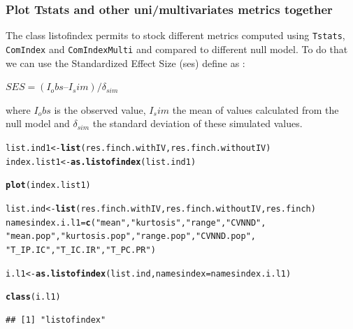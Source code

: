 \documentclass[12pt]{article}\usepackage[]{graphicx}\usepackage[]{color}
\makeatletter
\newcommand{\hlstr}[1]{\textcolor[rgb]{0.192,0.494,0.8}{#1}}%
\newcommand{\hlstd}[1]{\textcolor[rgb]{0.345,0.345,0.345}{#1}}%
\newcommand{\hlkwb}[1]{\textcolor[rgb]{0.69,0.353,0.396}{#1}}%
\newcommand{\hlkwc}[1]{\textcolor[rgb]{0.333,0.667,0.333}{#1}}%
\newcommand{\hlkwd}[1]{\textcolor[rgb]{0.737,0.353,0.396}{\textbf{#1}}}%
\newenvironment{kframe}{%
 \def\at@end@of@kframe{}%
 \ifinner\ifhmode%
  \def\at@end@of@kframe{\end{minipage}}%
  \begin{minipage}{\columnwidth}%
 \fi\fi%
 \def\FrameCommand##1{\hskip\@totalleftmargin \hskip-\fboxsep
 \colorbox{shadecolor}{##1}\hskip-\fboxsep
     \hskip-\linewidth \hskip-\@totalleftmargin \hskip\columnwidth}%
 \MakeFramed {\advance\hsize-\width
   \@totalleftmargin\z@ \linewidth\hsize
   \@setminipage}}%
 {\par\unskip\endMakeFramed%
 \at@end@of@kframe}
\newenvironment{knitrout}{}{} %
\makeatother
\begin{document}
\subsubsection{Plot Tstats and other uni/multivariates metrics together}
The class listofindex permits to stock different metrics computed using \texttt{Tstats}, \texttt{ComIndex} and \texttt{ComIndexMulti} and compared to different null model. To do that we can use the Standardized Effect Size (ses) define as : 

\begin{center}
$SES = (I_obs – I_sim) / \delta_{sim}$
\end{center}

where $I_obs$ is the observed value, $I_sim$ the mean of values calculated from the null model and $\delta_{sim}$ the standard deviation of these simulated values.


\begin{knitrout}
\color{fgcolor}\begin{kframe}
\begin{alltt}
\hlstd{list.ind1}\hlkwb{<-}\hlkwd{list}\hlstd{(res.finch.withIV, res.finch.withoutIV)}
\hlstd{index.list1}\hlkwb{<-}\hlkwd{as.listofindex}\hlstd{(list.ind1)}

\hlkwd{plot}\hlstd{(index.list1)}
\end{alltt}
\end{kframe}
\end{knitrout}

\begin{knitrout}
\color{fgcolor}\begin{kframe}
\begin{alltt}
\hlstd{list.ind}\hlkwb{<-}\hlkwd{list}\hlstd{(res.finch.withIV, res.finch.withoutIV, res.finch)}
\hlstd{namesindex.i.l1} \hlkwb{=} \hlkwd{c}\hlstd{(}\hlstr{"mean"}\hlstd{,} \hlstr{"kurtosis"}\hlstd{,} \hlstr{"range"}\hlstd{,} \hlstr{"CVNND"}\hlstd{,}
         \hlstr{"mean.pop"}\hlstd{,} \hlstr{"kurtosis.pop"}\hlstd{,} \hlstr{"range.pop"}\hlstd{,} \hlstr{"CVNND.pop"}\hlstd{,}
         \hlstr{"T_IP.IC"}\hlstd{,} \hlstr{"T_IC.IR"}\hlstd{,} \hlstr{"T_PC.PR"}\hlstd{)}

\hlstd{i.l1}\hlkwb{<-}\hlkwd{as.listofindex}\hlstd{(list.ind,} \hlkwc{namesindex} \hlstd{= namesindex.i.l1)}

\hlkwd{class}\hlstd{(i.l1)}
\end{alltt}
\begin{verbatim}
## [1] "listofindex"
\end{verbatim}
\end{kframe}
\end{knitrout}
\end{document}
